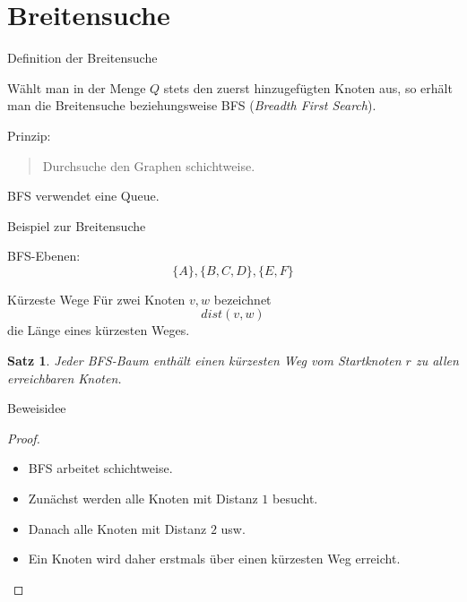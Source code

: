 \documentclass{beamer}
\newtheorem{satz}{Satz}
\begin{document}
\section{Breitensuche}
\begin{frame}{Definition der Breitensuche}
\begin{definition}
Wählt man in der Menge \(Q\) stets den zuerst hinzugefügten Knoten aus, so erhält man die Breitensuche beziehungsweise BFS (\emph{Breadth First Search}).
\end{definition}
\vspace{0.5cm}
Prinzip:
\begin{quote}
Durchsuche den Graphen schichtweise.
\end{quote}
\vspace{0.4cm}
BFS verwendet eine Queue.
\end{frame}
\begin{frame}{Beispiel zur Breitensuche}
\begin{center}
\end{center}
\vspace{0.3cm}
BFS-Ebenen:
\[\{A\},\{B,C,D\},\{E,F\}\]
\end{frame}
\begin{frame}{Kürzeste Wege}
Für zwei Knoten \(v,w\) bezeichnet
\[dist(v,w)\]
die Länge eines kürzesten Weges.
\vspace{0.5cm}
\begin{satz}
Jeder BFS-Baum enthält einen kürzesten Weg vom Startknoten \(r\) zu allen erreichbaren Knoten.
\end{satz}
\end{frame}
\begin{frame}{Beweisidee}
\begin{proof}
\begin{itemize}
    \item BFS arbeitet schichtweise.
    \item Zunächst werden alle Knoten mit Distanz \(1\) besucht.
    \item Danach alle Knoten mit Distanz \(2\) usw.
    \item Ein Knoten wird daher erstmals über einen kürzesten Weg erreicht.
\end{itemize}
\end{proof}
\end{frame}
\end{document}
